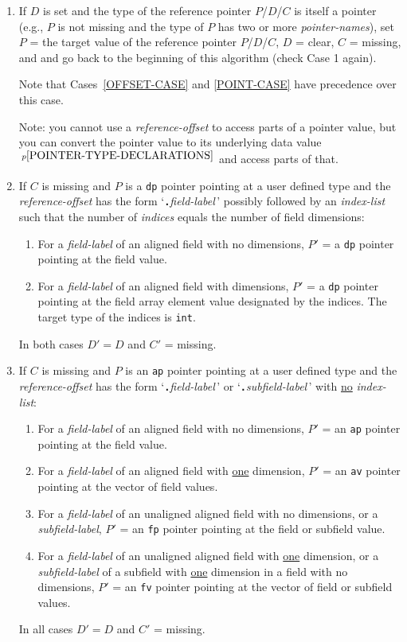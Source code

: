 \documentclass[12pt]{article}
\newcommand{\TT}[1]{{\tt \bfseries #1}}
\newcommand{\pagnote}[1]{$\,^{p\pageref{#1}}$}
\begin{document}
\begin{enumerate}
\item\label{POINTER-CASE}
If $D$ is set and the type of the reference pointer $P$/$D$/$C$
is itself a pointer (e.g., $P$ is not missing and the type of $P$
has two or more {\em pointer-names}), set $P$ = the target value of
the reference pointer $P$/$D$/$C$, $D$ = clear, $C$ = missing, and
and go back to the beginning of this algorithm (check Case 1 again).

Note that Cases~\ref{OFFSET-CASE} and \ref{POINT-CASE}
have precedence over this case.

Note: you cannot use a {\em reference-offset} to access parts of a
pointer value, but you can convert the pointer value to its underlying
data value\pagnote{POINTER-TYPE-DECLARATIONS} and access parts of that.

\item\label{DP-CASE}
If $C$ is missing and
$P$ is a {\tt dp} pointer pointing at a user defined type and the
{\em reference-offset} has the form `\TT{.}{\em field-label}\,'
possibly followed by an {\em index-list} such that the number of
{\em indices} equals the number of field dimensions:
\begin{enumerate}
\item For a {\em field-label} of an aligned field with no
dimensions, $P'$ = a {\tt dp} pointer pointing at the field value.
\item For a {\em field-label} of an aligned field with dimensions,
$P'$ = a {\tt dp} pointer pointing
at the field array element value designated by the indices.
The target type of the indices is {\tt int}.
\end{enumerate}
In both cases $D'=D$ and $C'$ = missing.

\item\label{AP-NO-INDEX-CASE}
If $C$ is missing and
$P$ is an {\tt ap} pointer pointing at a user defined type and the
{\em reference-offset} has the form
`\TT{.}{\em field-label}\,' or `\TT{.}{\em subfield-label}\,' with
\underline{no} {\em index-list}:
\begin{enumerate}
\item For a {\em field-label} of an aligned field with no
dimensions, $P'$ = an {\tt ap} pointer pointing at the field value.
\item For a {\em field-label} of an aligned field with \underline{one}
dimension, $P'$ = an {\tt av} pointer pointing at the vector of field values.
\item For a {\em field-label} of an unaligned aligned field with no
dimensions, or a {\em subfield-label},
$P'$ = an {\tt fp} pointer pointing at the
field or subfield value.
\item For a {\em field-label} of an unaligned aligned field with \underline{one}
dimension, or a {\em subfield-label} of a subfield with \underline{one}
dimension in a field with no dimensions,
$P'$ = an {\tt fv} pointer pointing at the vector of
field or subfield values.
\end{enumerate}
In all cases $D'=D$ and $C'$ = missing.


\end{enumerate}
\end{document}
